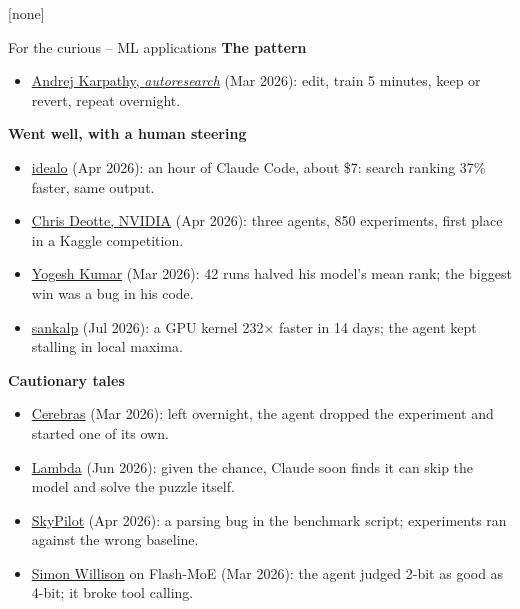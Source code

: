 \documentclass[aspectratio=169, 10pt]{beamer}
\begin{document}
{[none]
\begin{frame}[noframenumbering]{For the curious -- ML applications}
  \footnotesize
  \textbf{The pattern}
  \begin{itemize}
    \item \href{https://github.com/karpathy/autoresearch}{Andrej Karpathy, \emph{autoresearch}} (Mar 2026): edit, train 5 minutes,
      keep or revert, repeat overnight.
  \end{itemize}
  \textbf{Went well, with a human steering}
  \begin{itemize}
    \item \href{https://medium.com/idealo-tech-blog/one-hour-37-faster-applying-autoresearch-to-our-search-ranking-inference-endpoint-34cffc08e373}{idealo} (Apr 2026): an hour of Claude Code, about \$7: search ranking
      37\% faster, same output.
    \item \href{https://developer.nvidia.com/blog/winning-a-kaggle-competition-with-generative-ai-assisted-coding/}{Chris Deotte, NVIDIA} (Apr 2026): three agents, 850 experiments, first
      place in a Kaggle competition.
    \item \href{https://ykumar.me/blog/eclip-autoresearch/}{Yogesh Kumar} (Mar 2026): 42 runs halved his model's mean rank; the
      biggest win was a bug in his code.
    \item \href{https://sankalp.bearblog.dev/autoresearch/}{sankalp} (Jul 2026): a GPU kernel 232$\times$ faster in 14 days; the
      agent kept stalling in local maxima.
  \end{itemize}
  \textbf{Cautionary tales}
  \begin{itemize}
    \item \href{https://www.cerebras.ai/blog/how-to-stop-your-autoresearch-loop-from-cheating}{Cerebras} (Mar 2026): left overnight, the agent dropped the experiment
      and started one of its own.
    \item \href{https://lambda.ai/blog/what-happens-when-claude-code-gets-an-experiment-tracker}{Lambda} (Jun 2026): given the chance, Claude soon finds it can skip the
      model and solve the puzzle itself.
    \item \href{https://skypilot.ai/blog/research-driven-agents}{SkyPilot} (Apr 2026): a parsing bug in the benchmark script;
      experiments ran against the wrong baseline.
    \item \href{https://simonwillison.net/2026/Mar/18/llm-in-a-flash/}{Simon Willison} on Flash-MoE (Mar 2026): the agent judged 2-bit as
      good as 4-bit; it broke tool calling.
  \end{itemize}
\end{frame}
}
\end{document}
